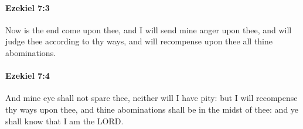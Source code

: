 		\paragraph{Ezekiel 7:3} %
			\label{EZEKIEL-7-3}

			Now is the end come upon thee, and I will send mine anger upon thee, and will judge thee according to thy ways, and will recompense upon thee all thine abominations.


		\paragraph{Ezekiel 7:4} %
			\label{EZEKIEL-7-4}

			And mine eye shall not spare thee, neither will I have pity: but I will recompense thy ways upon thee, and thine abominations shall be in the midst of thee: and ye shall know that I am the LORD.


